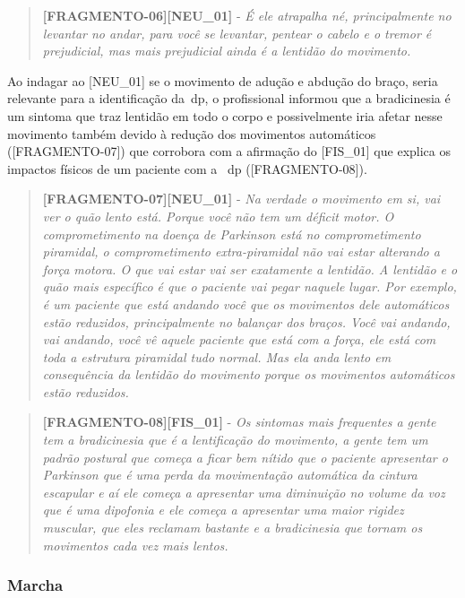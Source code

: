 \begin{quote}
\textbf{[FRAGMENTO-06][NEU\_01]} - 
\emph{
É ele atrapalha né, principalmente no levantar no andar, para você se levantar, pentear o cabelo e o tremor é prejudicial, mas mais prejudicial ainda é a lentidão do movimento.
}
\end{quote}


Ao indagar ao [NEU\_01] se o movimento de adução e abdução do braço, seria relevante para a identificação da~\ac{dp}, o profissional informou que a bradicinesia é um sintoma que traz lentidão em todo o corpo e possivelmente iria afetar nesse movimento também devido à redução dos movimentos automáticos ([FRAGMENTO-07]) que corrobora com a afirmação do [FIS\_01] que explica os impactos físicos de um paciente com a ~\ac{dp} ([FRAGMENTO-08]).

\begin{quote}
\textbf{[FRAGMENTO-07][NEU\_01]} - 
\emph{
Na verdade o movimento em si, vai ver o quão lento está. Porque você não tem um déficit motor. O comprometimento na doença de Parkinson está no comprometimento piramidal, o comprometimento extra-piramidal não vai estar alterando a força motora. O que vai estar vai ser exatamente a lentidão. A lentidão e o quão mais específico é que o paciente vai pegar naquele lugar. Por exemplo, é um paciente que está andando você que os movimentos dele automáticos estão reduzidos, principalmente no balançar dos braços. Você vai andando, vai andando, você vê aquele paciente que está com a força, ele está com toda a estrutura piramidal tudo normal. Mas ela anda lento em consequência da lentidão do movimento porque os movimentos automáticos estão reduzidos.
}
\end{quote}


\begin{quote}
\textbf{[FRAGMENTO-08][FIS\_01]} - 
\emph{
Os sintomas mais frequentes a gente tem a bradicinesia que é a lentificação do movimento, a gente tem um padrão postural que começa a ficar bem nítido que o paciente apresentar o Parkinson que é uma perda da movimentação automática da cintura escapular e aí ele começa a apresentar uma diminuição no volume da voz que é uma dipofonia e ele começa a apresentar uma maior rigidez muscular, que eles reclamam bastante e a bradicinesia que tornam os movimentos cada vez mais lentos.
}
\end{quote}



\subsubsection{Marcha}

